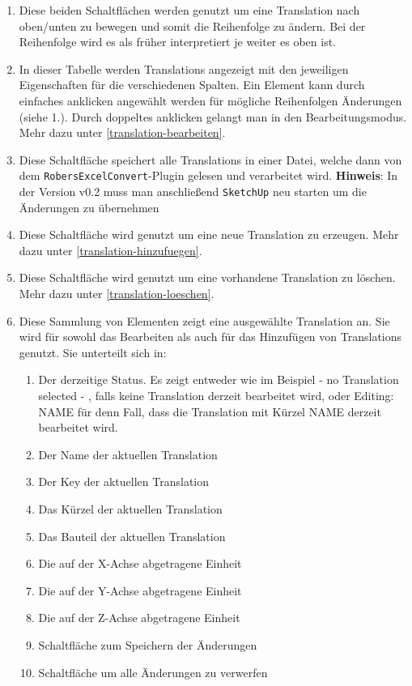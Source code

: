 \documentclass{book}
\newcommand{\sketchup}{\texttt{SketchUp}\xspace}
\newcommand{\robersexcelconvert}{\texttt{RobersExcelConvert}\xspace}
\newcommand{\hinweis}[1]{\newline \textbf{Hinweis}: #1 \newline}
\newcommand{\green}[1]{\color{green!50!black}#1\color{black}\xspace}
\newcommand{\red}[1]{\color{red}#1\color{black}\xspace}
\begin{document}
				\begin{enumerate}
					\item Diese beiden Schaltflächen werden genutzt um eine Translation nach oben/unten zu bewegen und somit die Reihenfolge zu ändern. Bei der Reihenfolge wird es als früher interpretiert je weiter es oben ist.
					\item In dieser Tabelle werden Translations angezeigt mit den jeweiligen Eigenschaften für die verschiedenen Spalten. Ein Element kann durch einfaches anklicken angewählt werden für mögliche Reihenfolgen Änderungen (siehe 1.). Durch doppeltes anklicken gelangt man in den Bearbeitungsmodus. Mehr dazu unter \hyperref[translation-bearbeiten]{\ref{translation-bearbeiten}}.
					\item Diese Schaltfläche speichert alle Translations in einer Datei, welche dann von dem \robersexcelconvert-Plugin gelesen und verarbeitet wird.
					\hinweis{In der Version v0.2 muss man anschließend \sketchup neu starten um die Änderungen zu übernehmen}
					\item Diese Schaltfläche wird genutzt um eine neue Translation zu erzeugen. Mehr dazu unter \hyperref[translation-hinzufuegen]{\ref{translation-hinzufuegen}}.
					\item Diese Schaltfläche wird genutzt um eine vorhandene Translation zu löschen. Mehr dazu unter \hyperref[translation-loeschen]{\ref{translation-loeschen}}.
					\item Diese Sammlung von Elementen zeigt eine ausgewählte Translation an. Sie wird für sowohl das Bearbeiten als auch für das Hinzufügen von Translations genutzt. Sie unterteilt sich in:	
						\begin{enumerate}[label*=\arabic*]
							\item Der derzeitige Status. Es zeigt entweder wie im Beispiel \glqq\green{- no Translation selected -} \grqq, falls keine Translation derzeit bearbeitet wird, oder \glqq \red{Editing: NAME} \grqq für denn Fall, dass die Translation mit Kürzel NAME derzeit bearbeitet wird. 
							\item Der Name der aktuellen Translation
							\item Der Key der aktuellen Translation
							\item Das Kürzel der aktuellen Translation
							\item Das Bauteil der aktuellen Translation
							\item Die auf der X-Achse abgetragene Einheit
							\item Die auf der Y-Achse abgetragene Einheit
							\item Die auf der Z-Achse abgetragene Einheit
							\item Schaltfläche zum Speichern der Änderungen
							\item Schaltfläche um alle Änderungen zu verwerfen
						\end{enumerate}
				\end{enumerate}
			
\end{document}
